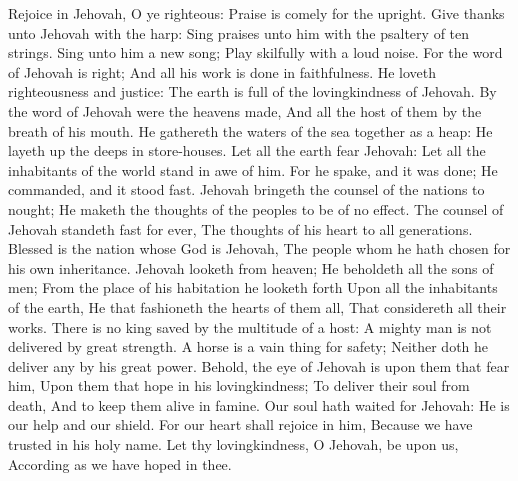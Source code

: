 Rejoice in Jehovah, O ye righteous: Praise is comely for the upright.  Give thanks unto Jehovah with the harp: Sing praises unto him with the psaltery of ten strings.  Sing unto him a new song; Play skilfully with a loud noise.  For the word of Jehovah is right; And all his work is done in faithfulness.  He loveth righteousness and justice: The earth is full of the lovingkindness of Jehovah.  By the word of Jehovah were the heavens made, And all the host of them by the breath of his mouth.  He gathereth the waters of the sea together as a heap: He layeth up the deeps in store-houses.  Let all the earth fear Jehovah: Let all the inhabitants of the world stand in awe of him.  For he spake, and it was done; He commanded, and it stood fast.  Jehovah bringeth the counsel of the nations to nought; He maketh the thoughts of the peoples to be of no effect.  The counsel of Jehovah standeth fast for ever, The thoughts of his heart to all generations.  Blessed is the nation whose God is Jehovah, The people whom he hath chosen for his own inheritance.  Jehovah looketh from heaven; He beholdeth all the sons of men;  From the place of his habitation he looketh forth Upon all the inhabitants of the earth,  He that fashioneth the hearts of them all, That considereth all their works.  There is no king saved by the multitude of a host: A mighty man is not delivered by great strength.  A horse is a vain thing for safety; Neither doth he deliver any by his great power.  Behold, the eye of Jehovah is upon them that fear him, Upon them that hope in his lovingkindness;  To deliver their soul from death, And to keep them alive in famine.  Our soul hath waited for Jehovah: He is our help and our shield.  For our heart shall rejoice in him, Because we have trusted in his holy name.  Let thy lovingkindness, O Jehovah, be upon us, According as we have hoped in thee. 

